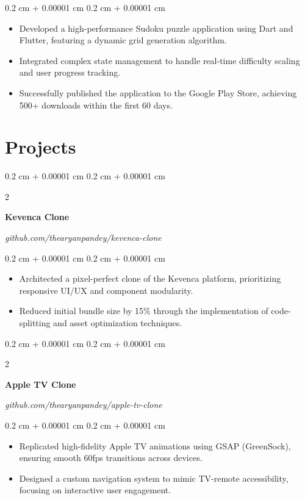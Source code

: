 \documentclass[10pt, a4paper]{article}
\newenvironment{highlights}{
    \begin{itemize}[
        topsep=0.10 cm,
        parsep=0.10 cm,
        partopsep=0pt,
        itemsep=0pt,
        leftmargin=0.4 cm + 10pt
    ]
}{
    \end{itemize}
} %
\newenvironment{onecolentry}{
    \begin{adjustwidth}{
        0.2 cm + 0.00001 cm
    }{
        0.2 cm + 0.00001 cm
    }
}{
    \end{adjustwidth}
} %
\newenvironment{twocolentry}[2][]{
    \onecolentry
    \def\secondColumn{#2}
    \setcolumnwidth{\fill, 4.5 cm}
    \begin{paracol}{2}
}{
    \switchcolumn \raggedleft \secondColumn
    \end{paracol}
    \endonecolentry
} %
\begin{document}
        \vspace{0.10 cm}
        \begin{onecolentry}
        \begin{highlights}
            \item Developed a high-performance Sudoku puzzle application using Dart and Flutter, featuring a dynamic grid generation algorithm.
\item Integrated complex state management to handle real-time difficulty scaling and user progress tracking.
\item Successfully published the application to the Google Play Store, achieving 500+ downloads within the first 60 days.
        \end{highlights}
        \end{onecolentry}
        \vspace{0.2 cm}
        

    \section{Projects}
\begin{twocolentry}{
        \textit{github.com/thearyanpandey/kevenca-clone}
    }
    \textbf{Kevenca Clone}
    \end{twocolentry}

    \vspace{0.10 cm}
    \begin{onecolentry}
    \begin{highlights}
        \item Architected a pixel-perfect clone of the Kevenca platform, prioritizing responsive UI/UX and component modularity.
\item Reduced initial bundle size by 15\% through the implementation of code-splitting and asset optimization techniques.
    \end{highlights}
    \end{onecolentry}
    \vspace{0.2 cm}
\begin{twocolentry}{
        \textit{github.com/thearyanpandey/apple-tv-clone}
    }
    \textbf{Apple TV Clone}
    \end{twocolentry}

    \vspace{0.10 cm}
    \begin{onecolentry}
    \begin{highlights}
        \item Replicated high-fidelity Apple TV animations using GSAP (GreenSock), ensuring smooth 60fps transitions across devices.
\item Designed a custom navigation system to mimic TV-remote accessibility, focusing on interactive user engagement.
    \end{highlights}
    \end{onecolentry}
    \vspace{0.2 cm}
\end{document}
